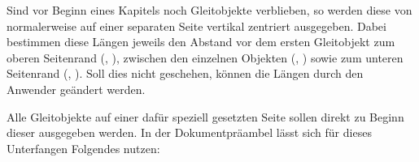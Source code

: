 \begin{Declaration}{}
\begin{Declaration}{}
\begin{Declaration}{}
\begin{Declaration}{}
\begin{Declaration}{}
\begin{Declaration}{}
\printdeclarationlist%
%
Sind vor Beginn eines Kapitels noch Gleitobjekte verblieben, so werden diese 
von  normalerweise auf einer separaten Seite vertikal zentriert 
ausgegeben. Dabei bestimmen diese Längen jeweils den Abstand vor dem ersten 
Gleitobjekt zum oberen Seitenrand (, ), 
zwischen den einzelnen Objekten (, ) sowie 
zum unteren Seitenrand (, ). Soll dies nicht 
geschehen, können die Längen durch den Anwender geändert werden.
\end{Declaration}
\end{Declaration}
\end{Declaration}
\end{Declaration}
\end{Declaration}
\end{Declaration}
%
\begin{Example}
Alle Gleitobjekte auf einer dafür speziell gesetzten Seite sollen direkt zu 
Beginn dieser ausgegeben werden. In der Dokumentpräambel lässt sich für dieses 
Unterfangen Folgendes nutzen:
\begin{Code}
\makeatletter
\setlength{\@fptop}{0pt}
\setlength{\@dblfptop}{0pt}%
\makeatother
\end{Code}
\end{Example}



